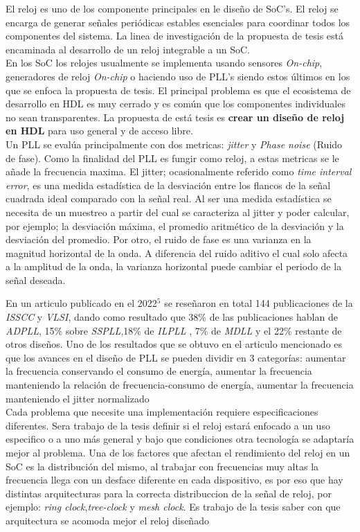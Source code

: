 \documentclass[runningheads,a4paper]{llncs}
\begin{document}
    El reloj es uno de los componente principales en le diseño de SoC's. El reloj se encarga de generar señales periódicas estables esenciales para coordinar todos los componentes del sistema. La linea de investigación de la propuesta de tesis está encaminada al desarrollo de un reloj integrable a un SoC.\\

   En los SoC los relojes usualmente se implementa usando sensores \textit{On-chip}, generadores de reloj \textit{On-chip} o haciendo uso de PLL's siendo estos últimos en los que se enfoca la propuesta de tesis. El principal problema es que el ecosistema de desarrollo en HDL es muy cerrado y es común que los componentes individuales no sean transparentes. La propuesta de está tesis es \textbf{crear un diseño de reloj en HDL} para uso general y de acceso libre.\\

    Un PLL se evalúa principalmente con dos metricas: \textit{jitter} y \textit{Phase noise} (Ruido de fase). Como la finalidad del PLL es fungir como reloj, a estas metricas se le añade la frecuencia maxima.
    El jitter; ocasionalmente referido como \textit{time interval error}, es una medida estadística de la desviación entre los flancos de la señal cuadrada ideal comparado con la señal real. Al ser una medida estadística se necesita de un muestreo a partir del cual se caracteriza al jitter y poder calcular, por ejemplo; la desviación máxima, el promedio aritmético de la desviación y la desviación del promedio. Por otro, el ruido de fase es una varianza en la magnitud horizontal de la onda. A diferencia del ruido aditivo el cual solo afecta a la amplitud de la onda, la varianza horizontal puede cambiar el periodo de la señal deseada.

    En un articulo publicado en el 2022${}^5$ se reseñaron en total 144 publicaciones de la \textit{ISSCC} y \textit{VLSI}, dando como resultado que 38\% de las publicaciones hablan de \textit{ADPLL}, 15\% sobre \textit{SSPLL},18\% de \textit{ILPLL} , 7\% de \textit{MDLL} y el 22\% restante de otros diseños.
    Uno de los resultados que se obtuvo en el articulo mencionado es que los avances en el diseño de PLL se pueden dividir en 3 categorías: aumentar la frecuencia conservando el consumo de energía, aumentar la frecuencia manteniendo la relación de frecuencia-consumo de energía, aumentar la frecuencia manteniendo el jitter normalizado\\
    
    Cada problema que necesite una implementación requiere especificaciones diferentes. Sera trabajo de la tesis definir si el reloj estará enfocado a un uso especifico o a uno más general y bajo que condiciones otra tecnología se adaptaría mejor al problema. Una de los factores que afectan el rendimiento del reloj en un SoC es la distribución del mismo, al trabajar con frecuencias muy altas la frecuencia llega con un desface diferente en cada dispositivo, es por eso que hay distintas arquitecturas para la correcta distribuccion de la señal de reloj, por ejemplo: \textit{ring clock},\textit{tree-clock} y \textit{mesh clock}. Es trabajo de la tesis saber con que arquitectura se acomoda mejor el reloj diseñado\\
\end{document}
